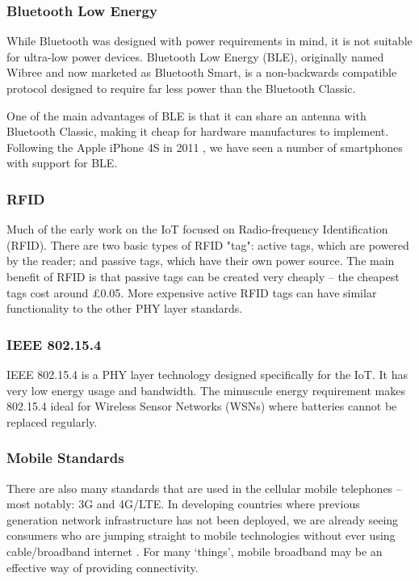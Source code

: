\documentclass[10pt,journal,compsoc]{IEEEtran}
\begin{document}
\subsubsection{Bluetooth Low Energy}
While Bluetooth was designed with power requirements in mind, it is not
suitable for ultra-low power devices. Bluetooth Low Energy (BLE), originally
named Wibree and now marketed as Bluetooth Smart, is a non-backwards
compatible protocol designed to require far less power than the Bluetooth
Classic. 

One of the main advantages of BLE is that it can share an antenna with
Bluetooth Classic, making it cheap for hardware manufactures to implement.
Following the Apple iPhone 4S in 2011 \cite{Engadget2011}, we have seen a
number of smartphones with support for BLE.

\subsubsection{RFID}
Much of the early work on the IoT focused on Radio-frequency Identification
(RFID). There are two basic types of RFID "tag": active tags, which are powered
by the reader; and passive tags, which have their own power source. The main
benefit of RFID is that passive tags can be created very cheaply -- the
cheapest tags cost around \pounds0.05. More expensive active RFID tags can
have similar functionality to the other PHY layer standards. 

\subsubsection{IEEE 802.15.4}
IEEE 802.15.4 is a PHY layer technology designed specifically for the IoT. It
has very low energy usage and bandwidth. The minuscule energy requirement makes
802.15.4 ideal for Wireless Sensor Networks (WSNs) where batteries cannot be
replaced regularly. 

\subsubsection{Mobile Standards}
There are also many standards that are used in the cellular mobile telephones
-- most notably: 3G and 4G/LTE. In developing countries where previous
generation network infrastructure has not been deployed, we are already seeing
consumers who are jumping straight to mobile technologies without ever using
cable/broadband internet \cite{Kritzinger2013}. For many `things', mobile
broadband may be an effective way of providing connectivity.  
\end{document}
